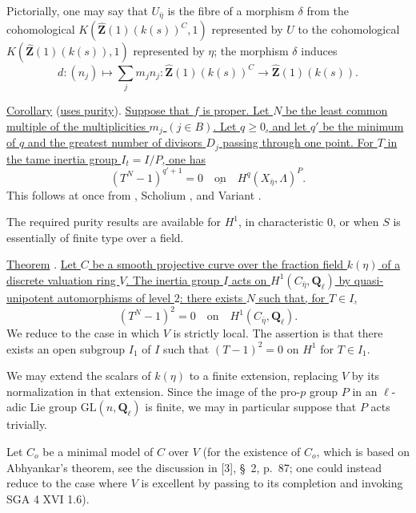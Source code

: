 Pictorially, one may say that $U_{\bar\eta}$ is the fibre of a morphism
$\delta$ from the cohomological
$K(\widehat{\mathbf Z}(1)(k(s))^C,1)$ represented by $U$ to the
cohomological $K(\widehat{\mathbf Z}(1)(k(s)),1)$ represented by $\eta$;
the morphism $\delta$ induces
\[
d:(n_j)\longmapsto\sum_jm_jn_j:
\widehat{\mathbf Z}(1)(k(s))^C
\longrightarrow\widehat{\mathbf Z}(1)(k(s)).
\]

\underline{Corollary}  (\underline{uses purity}). \underline{Suppose
that $f$ is proper. Let $N$ be the least common multiple of the
multiplicities $m_j$ $(j\in B)$. Let $q\geqslant0$, and let $q'$ be the
minimum of $q$ and the greatest number of divisors $D_j$ passing through
one point. For $T$ in the tame inertia group $I_t=I/P$, one has}
\begin{equation*}
(T^N-1)^{q'+1}=0
\quad\underline{\text{on}}\quad
H^q(X_{\bar\eta},\Lambda)^P.
\end{equation*}
This follows at once from , Scholium , and Variant .

The required purity results are available for $H^1$, in characteristic
$0$, or when $S$ is essentially of finite type over a field.

\underline{Theorem} . \underline{Let $C$ be a smooth projective curve
over the fraction field $k(\eta)$ of a discrete valuation ring $V$. The
inertia group $I$ acts on $H^1(C_{\bar\eta},\mathbf Q_\ell)$ by
quasi-unipotent automorphisms of level $2$: there exists $N$ such that,
for $T\in I$,}
\begin{equation*}
(T^N-1)^2=0
\quad\text{on}\quad H^1(C_{\bar\eta},\mathbf Q_\ell).
\end{equation*}
We reduce to the case in which $V$ is strictly local. The assertion is
that there exists an open subgroup $I_1$ of $I$ such that
$(T-1)^2=0$ on $H^1$ for $T\in I_1$.


We may extend the scalars of $k(\eta)$ to a finite extension, replacing
$V$ by its normalization in that extension. Since the image of the
pro-$p$ group $P$ in an $\ell$-adic Lie group
$\mathrm{GL}(n,\mathbf Q_\ell)$ is finite, we may in particular suppose
that $P$ acts trivially.

Let $C_o$ be a minimal model of $C$ over $V$ (for the existence of
$C_o$, which is based on Abhyankar's theorem, see the discussion in [3],
\S~2, p.~87; one could instead reduce to the case where $V$ is excellent
by passing to its completion and invoking SGA 4 XVI 1.6).

